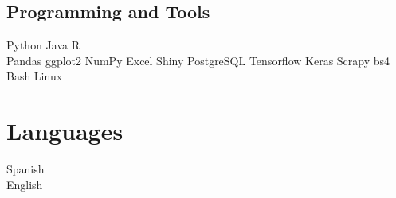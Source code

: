 \documentclass[]{deedy-resume-openfont}
\begin{document}
\begin{minipage}[t]{0.33\textwidth}
\subsection{Programming and Tools}
Python \textbullet{}   Java \textbullet{}  R \\
Pandas \textbullet{} ggplot2 \textbullet{} NumPy \textbullet{} Excel \textbullet{} 
Shiny \textbullet{} PostgreSQL \textbullet{} Tensorflow \textbullet{} Keras \textbullet{} Scrapy \textbullet{} bs4 \\
Bash \textbullet{} Linux
\sectionsep


\section{Languages}
 Spanish \\
 English
\sectionsep

%
%

\end{minipage} 
\hfill
\end{document}
